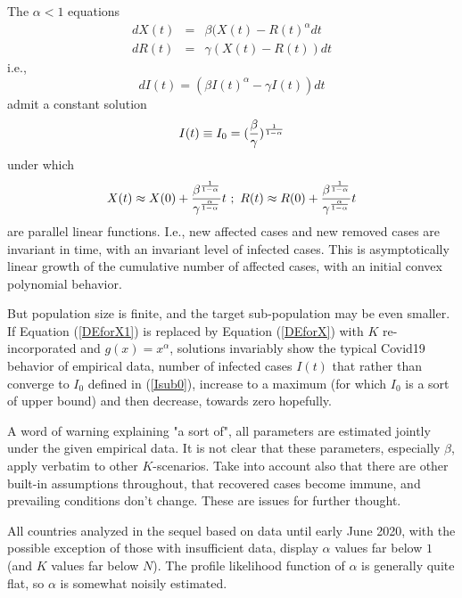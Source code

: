 \documentclass{article}
\begin{document}
The $\alpha<1$ equations
\begin{eqnarray}
dX(t) & = & \beta (X(t)-R(t)^\alpha dt \label{DEforX1} \\
dR(t) & = & \gamma (X(t)-R(t)) dt \label{DEforR1}
\end{eqnarray}
i.e.,
\begin{equation} \label{DEforI}
d I(t) = (\beta I(t)^\alpha - \gamma I(t))dt
\end{equation}
admit a constant solution
\begin{equation} \label{Isub0}
I(t) \equiv I_0 = ({\beta \over \gamma})^{1 \over {1-\alpha}}
\end{equation}
under which
\begin{equation} \label{slopes}
X(t) \approx X(0)+{{\beta^{1 \over {1-\alpha}}} \over {\gamma^{\alpha \over {1-\alpha}}}} t  \ ; \ R(t) \approx R(0)+{{\beta^{1 \over {1-\alpha}}} \over {\gamma^{\alpha \over {1-\alpha}}}} t
\end{equation}
are parallel linear functions. I.e., new affected cases and new removed cases are invariant in time, with an invariant level of infected cases.
This is asymptotically linear growth of the cumulative number of affected cases, with an initial convex polynomial behavior.

\bigskip

But population size is finite, and the target sub-population may be even smaller. If Equation (\ref{DEforX1}) is replaced by Equation (\ref{DEforX}) with $K$ re-incorporated and $g(x)=x^\alpha$, solutions invariably show the typical Covid19 behavior of empirical data, number of infected cases $I(t)$ that rather than converge to $I_0$ defined in (\ref{Isub0}), increase to a maximum (for which $I_0$ is a sort of upper bound) and then decrease, towards zero hopefully.

A word of warning explaining "a sort of", all parameters are estimated jointly under the given empirical data. It is not clear that these parameters, especially $\beta$, apply verbatim to other \linebreak $K$-scenarios. Take into account also that there are other built-in assumptions throughout, that recovered cases become immune, and prevailing conditions don't change. These are issues for further thought.

All countries analyzed in the sequel based on data until early June 2020, with the possible exception of those with insufficient data, display $\alpha$ values far below $1$ (and $K$ values far below $N$). The profile likelihood function of $\alpha$ is generally quite flat, so $\alpha$ is somewhat noisily estimated.
\end{document}
